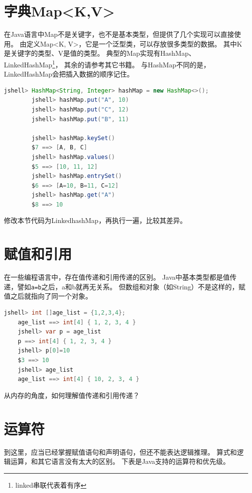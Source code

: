 \section{字典Map<K,V>}
	在Java语言中Map不是关键字，也不是基本类型，但提供了几个实现可以直接使用。
	由定义Map<K, V>，它是一个泛型类，可以存放很多类型的数据。
	其中K是关键字的类型、V是值的类型。
	典型的Map实现有HashMap、LinkedHashMap\footnote{linked串联代表着有序}，
	其余的请参考其它书籍。
	与HashMap不同的是，LinkedHashMap会把插入数据的顺序记住。
	\bigskip

	\begin{lstlisting}[language=Java, backgroundcolor=\color{lightgray!10}]
		jshell> HashMap<String, Integer> hashMap = new HashMap<>();
		jshell> hashMap.put("A", 10)
		jshell> hashMap.put("C", 12)
		jshell> hashMap.put("B", 11)

		jshell> hashMap.keySet()
		$7 ==> [A, B, C]
		jshell> hashMap.values()
		$5 ==> [10, 11, 12]
		jshell> hashMap.entrySet()
		$6 ==> [A=10, B=11, C=12]
		jshell> hashMap.get("A")
		$8 ==> 10
	\end{lstlisting}

	\begin{exercise}
		修改本节代码为LinkedhashMap，再执行一遍，比较其差异。
	\end{exercise}

\section{赋值和引用}
在一些编程语言中，存在值传递和引用传递的区别。
Java中基本类型都是值传递，譬如\lstinline{a=b}之后，a和b就再无关系。
但数组和对象（如String）不是这样的，赋值之后就指向了同一个对象。

\begin{lstlisting}[language=Java, backgroundcolor=\color{lightgray!10}]
	jshell> int []age_list = {1,2,3,4};
	age_list ==> int[4] { 1, 2, 3, 4 }
	jshell> var p = age_list
	p ==> int[4] { 1, 2, 3, 4 }
	jshell> p[0]=10
	$3 ==> 10
	jshell> age_list
	age_list ==> int[4] { 10, 2, 3, 4 }
\end{lstlisting}

\begin{exercise}
	从内存的角度，如何理解值传递和引用传递？
\end{exercise}


\section{运算符}
	到这里，应当已经掌握赋值语句和声明语句，但还不能表达逻辑推理。
	算式和逻辑运算，和其它语言没有太大的区别。
	下表是Java支持的运算符和优先级。

